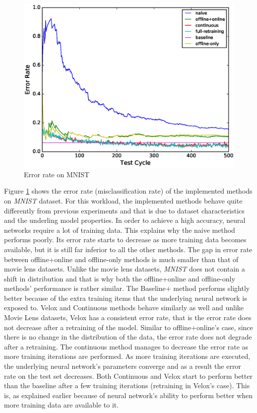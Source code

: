 \documentclass{vldb}
\begin{document}
\begin{figure}[h]
 \centering
 \includegraphics[width=\columnwidth]{../images/experiment-results/mnist-quality.eps}
 \caption{Error rate on MNIST}
 \label{fig:mnist-quality}
 \end{figure}
 
Figure \ref{fig:mnist-quality} shows the error rate (misclassification rate) of the implemented methods on \textit{MNIST} dataset.
For this workload, the implemented methods behave quite differently from previous experiments and that is due to dataset characteristics and the underling model properties.
In order to achieve a high accuracy, neural networks require a lot of training data.
This explains why the naive method performs poorly.
Its error rate starts to decrease as more training data becomes available, but it is still far inferior to all the other methods.
The gap in error rate between offline+online and offline-only methods is much smaller than that of movie lens datasets.
Unlike the movie lens datasets, \textit{MNIST} does not contain a shift in distribution and that is why both the offline+online and offline-only methods' performance is rather similar.
The Baseline+ method performs slightly better because of the extra training items that the underlying neural network is exposed to.
Velox and Continuous methods behave similarly as well and unlike Movie Lens datasets, Velox has a consistent error rate, that is the error rate does not decrease after a retraining of the model.
Similar to offline+online's case, since there is no change in the distribution of the data, the error rate does not degrade after a retraining.
The continuous method manages to decrease the error rate as more training iterations are performed.
As more training iterations are executed, the underlying neural network's parameters converge and as a result the error rate on the test set decreases.
Both Continuous and Velox start to perform better than the baseline after a few training iterations (retraining in Velox's case).
This is, as explained earlier because of neural network's ability to perform better when more training data are available to it.
\end{document}
